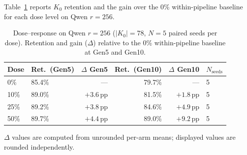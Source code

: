 \documentclass[a4paper,fleqn]{cas-dc}
\newif\ifshowchanges
\newcommand{\rev}[1]{\ifshowchanges{\color{blue}#1}\else{#1}\fi}
\newcommand{\Kcard}{\lvert K_0\rvert}
\begin{document}
\rev{Table~\ref{tab:interventions} reports $K_0$ retention and the gain over
the 0\% within-pipeline baseline for each dose level on Qwen $r=256$.}

\begin{table}[width=.95\linewidth,cols=6,pos=htbp]
\caption{\rev{Dose--response on Qwen $r=256$ ($\Kcard=78$, $N=5$ paired seeds per
dose). Retention and gain ($\Delta$) relative to the 0\% within-pipeline
baseline at Gen5 and Gen10.}}\label{tab:interventions}
\begin{tabular*}{\tblwidth}{@{} llrrrl@{} }
\toprule
\rev{Dose} & \rev{Ret.\ (Gen5)} & \rev{$\Delta$ Gen5} & \rev{Ret.\ (Gen10)} & \rev{$\Delta$ Gen10} & \rev{$N_\mathrm{seeds}$} \\
\midrule
0\%  & \rev{85.4\%} & ---             & \rev{79.7\%} & ---             & 5 \\
10\% & 89.0\% & \rev{$+3.6$}\,pp & \rev{81.5\%} & \rev{$+1.8$}\,pp & 5 \\
25\% & 89.2\% & \rev{$+3.8$}\,pp & 84.6\% & \rev{$+4.9$}\,pp & 5 \\
50\% & 89.7\% & \rev{$+4.4$}\,pp & \rev{89.0\%} & \rev{$+9.2$}\,pp & 5 \\
\bottomrule
\end{tabular*}
{\footnotesize $\Delta$ values are computed from unrounded per-arm means; displayed values are rounded independently.}
\end{table}

\end{document}
